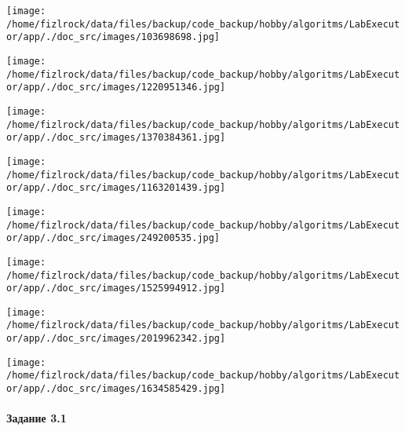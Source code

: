 \documentclass[a4paper, 12pt]{article}
\begin{document}
\texttt{[image: /home/fizlrock/data/files/backup/code\_backup/hobby/algoritms/LabExecutor/app/./doc\_src/images/103698698.jpg]}

\texttt{[image: /home/fizlrock/data/files/backup/code\_backup/hobby/algoritms/LabExecutor/app/./doc\_src/images/1220951346.jpg]}

\texttt{[image: /home/fizlrock/data/files/backup/code\_backup/hobby/algoritms/LabExecutor/app/./doc\_src/images/1370384361.jpg]}

\texttt{[image: /home/fizlrock/data/files/backup/code\_backup/hobby/algoritms/LabExecutor/app/./doc\_src/images/1163201439.jpg]}

\texttt{[image: /home/fizlrock/data/files/backup/code\_backup/hobby/algoritms/LabExecutor/app/./doc\_src/images/249200535.jpg]}

\texttt{[image: /home/fizlrock/data/files/backup/code\_backup/hobby/algoritms/LabExecutor/app/./doc\_src/images/1525994912.jpg]}

\texttt{[image: /home/fizlrock/data/files/backup/code\_backup/hobby/algoritms/LabExecutor/app/./doc\_src/images/2019962342.jpg]}

\texttt{[image: /home/fizlrock/data/files/backup/code\_backup/hobby/algoritms/LabExecutor/app/./doc\_src/images/1634585429.jpg]}
\pagebreak
\paragraph{Задание 3.1}
\end{document}
